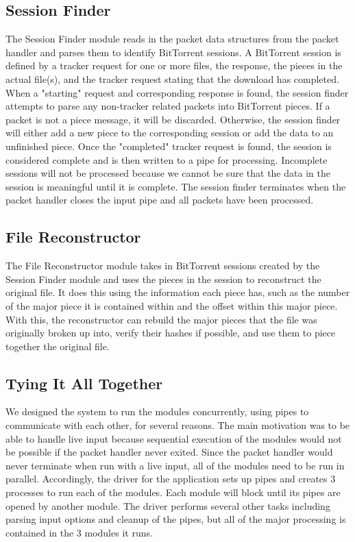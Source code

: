 \documentclass{acm_proc_article-sp}
\begin{document}
\subsection{Session Finder}
The Session Finder module reads in the packet data structures from the packet
handler and parses them to identify BitTorrent sessions. A BitTorrent session is
defined by a tracker request for one or more files, the response, the pieces in
the actual file(s), and the tracker request stating that the download has
completed. When a "starting" request and corresponding response is found, the
session finder attempts to parse any non-tracker related packets into BitTorrent
pieces. If a packet is not a piece message, it will be discarded. Otherwise, the
session finder will either add a new piece to the corresponding session or add
the data to an unfinished piece. Once the "completed" tracker request is found,
the session is considered complete and is then written to a pipe for
processing. Incomplete sessions will not be processed because we cannot be sure
that the data in the session is meaningful until it is complete. The session
finder terminates when the packet handler closes the input pipe and all packets
have been processed.

\subsection{File Reconstructor}
The File Reconstructor module takes in BitTorrent sessions created by the
Session Finder module and uses the pieces in the session to reconstruct the
original file.  It does this using the information each piece has, such as the
number of the major piece it is contained within and the offset within this
major piece.  With this, the reconstructor can rebuild the major pieces that
the file was originally broken up into, verify their hashes if possible, and
use them to piece together the original file.

\subsection{Tying It All Together}
We designed the system to run the modules concurrently, using pipes to
communicate with each other, for several reasons. The main motivation was to be
able to handle live input because sequential execution of the modules would not
be possible if the packet handler never exited. Since the packet handler would
never terminate when run with a live input, all of the modules need to be run in
parallel. Accordingly, the driver for the application sets up pipes and creates
3 processes to run each of the modules. Each module will block until its pipes
are opened by another module. The driver performs several other tasks including
parsing input options and cleanup of the pipes, but all of the major processing
is contained in the 3 modules it runs.
\end{document}
